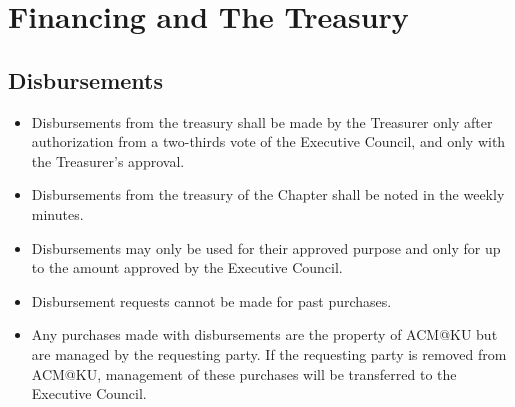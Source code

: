 %
%
\let\textcircled=\pgftextcircled
\chapter{Financing and The Treasury}
\label{chap:finance}

\initial{}

\section{Disbursements}
\begin{itemize}
  \item Disbursements from the treasury shall be made by the Treasurer only
        after authorization from a two-thirds vote of the Executive Council,
        and only with the Treasurer's approval.
  \item Disbursements from the treasury of the Chapter shall be noted in the
        weekly minutes.
  \item Disbursements may only be used for their approved purpose and only for
        up to the amount approved by the Executive Council.
  \item Disbursement requests cannot be made for past purchases.
  \item Any purchases made with disbursements are the property of ACM@KU but are
        managed by the requesting party. If the requesting party is removed from
        ACM@KU, management of these purchases will be transferred to the
        Executive Council.
\end{itemize}

